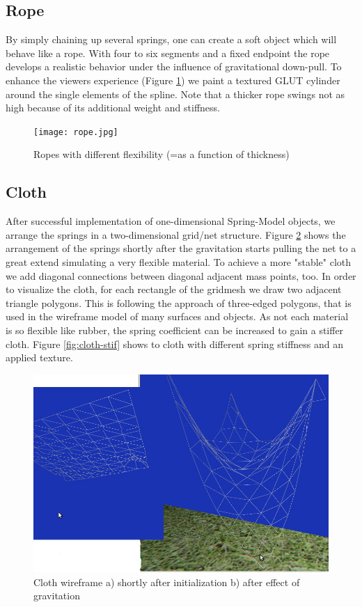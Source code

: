\documentclass[11pt]{article}
\begin{document}
\subsection{Rope}
By simply chaining up several springs, one can create a soft object which will behave like a rope. With four to six segments and a fixed endpoint the rope develops a realistic behavior under the influence of gravitational down-pull. To enhance the viewers experience (Figure \ref{fig:rope}) we paint a textured GLUT cylinder around the single elements of the spline. Note that a thicker rope swings not as high because of its additional weight and stiffness.

\begin{figure}[h]
\centering
\texttt{[image: rope.jpg]}
\caption{Ropes with different flexibility (=as a function of thickness)}
\label{fig:rope}
\end{figure}

\subsection{Cloth}
After successful implementation of one-dimensional Spring-Model objects, we arrange the springs in a two-dimensional grid/net structure. Figure \ref{fig:cloth-grid} shows the arrangement of the springs shortly after the gravitation starts pulling the net to a great extend simulating a very flexible material. To achieve a more "stable" cloth we add diagonal connections between diagonal adjacent mass points, too. In order to visualize the cloth, for each rectangle of the gridmesh we draw two adjacent triangle polygons. This is following the approach of three-edged polygons, that is used in the wireframe model of many surfaces and objects. As not each material is so flexible like rubber, the spring coefficient can be increased to gain a stiffer cloth. Figure \ref{fig:cloth-stif} shows to cloth with different spring stiffness and an applied texture.

\begin{figure}[h]
\centering
\includegraphics[scale=0.3]{cloth-grid.jpg}
\caption{Cloth wireframe a) shortly after initialization b) after effect of gravitation}
\label{fig:cloth-grid}
\end{figure}
\end{document}
